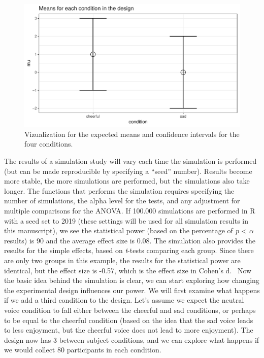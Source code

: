 \documentclass[,jou, draftfirst, a4paper,floatsintext]{apa6}
\begin{document}
\begin{figure}
\centering
\includegraphics{0.1_Simulation_Based_Power_Analysis_For_Factorial_ANOVA_Designs_files/figure-latex/mean-plot2-1.pdf}
\caption{\label{fig:mean-plot2}Vizualization for the expected means and confidence intervals for the four conditions.}
\end{figure}

The results of a simulation study will vary each time the simulation is performed (but can be made reproducible by specifying a \enquote{seed} number).
Results become more stable, the more simulations are performed, but the simulations also take longer. The functions that performs the simulation requires specifying the number of simulations, the alpha level for the tests, and any adjustment for multiple comparisons for the ANOVA.
If 100.000 simulations are performed in R with a seed set to 2019 (these settings will be used for all simulation results in this manuscript), we see the statistical power (based on the percentage of \emph{p} \textless{} \(\alpha\) results) is 90 and the average effect size is 0.08.
The simulation also provides the results for the simple effects, based on \emph{t}-tests comparing each group.
Since there are only two groups in this example, the results for the statistical power are identical, but the effect size is -0.57, which is the effect size in Cohen's d.~
Now the basic idea behind the simulation is clear, we can start exploring how changing the experimental design influences our power.
We will first examine what happens if we add a third condition to the design.
Let's assume we expect the neutral voice condition to fall either between the cheerful and sad conditions, or perhaps to be equal to the cheerful condition (based on the idea that the sad voice leads to less enjoyment, but the cheerful voice does not lead to more enjoyment).
The design now has 3 between subject conditions, and we can explore what happens if we would collect 80 participants in each condition.
\end{document}
